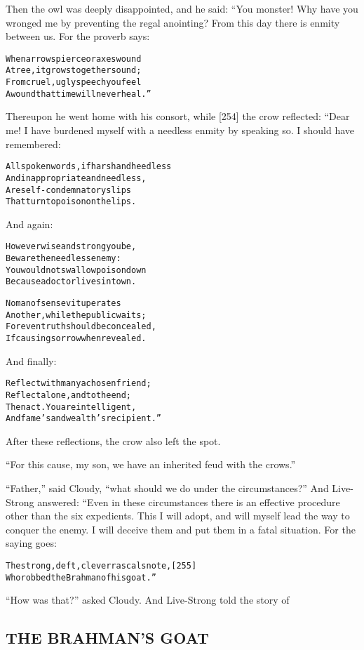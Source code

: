 \documentclass{article}
\renewenvironment{verbatim}{\begin{alltt}\normalfont\begin{centering}}{\end{centering}\end{alltt}}
\begin{document}
Then the owl was deeply disappointed, and he said: “You monster!
Why have you wronged me by preventing the regal anointing? From
this day there is enmity between us. For the proverb says:

\begin{verbatim}
When arrows pierce or axes wound
A tree, it grows together sound;
From cruel, ugly speech you feel
A wound that time will never heal.”
\end{verbatim}
Thereupon he went home with his consort, while [254] the crow
reflected: “Dear me! I have burdened myself with a needless enmity
by speaking so. I should have remembered:

\begin{verbatim}
All spoken words, if harsh and heedless
And inappropriate and needless,
Are self-condemnatory slips
That turn to poison on the lips.
\end{verbatim}
And again:

\begin{verbatim}
However wise and strong you be,
Beware the needless enemy:
You would not swallow poison down
Because a doctor lives in town.

No man of sense vituperates
Another, while the public waits;
For even truth should be concealed,
If causing sorrow when revealed.
\end{verbatim}
And finally:

\begin{verbatim}
Reflect with many a chosen friend;
Reflect alone, and to the end;
Then act. You are intelligent,
And fame's and wealth's recipient.”
\end{verbatim}
After these reflections, the crow also left the spot.

``For this cause, my son, we have an inherited feud with the crows.''

``Father,'' said Cloudy,
``what should we do under the circumstances?'' And Live-Strong
answered: “Even in these circumstances there is an effective
procedure other than the six expedients. This I will adopt, and
will myself lead the way to conquer the enemy. I will deceive them
and put them in a fatal situation. For the saying goes:

\begin{verbatim}
The strong, deft, clever rascals note,                  [255]
Who robbed the Brahman of his goat.”
\end{verbatim}
``How was that?'' asked Cloudy. And Live-Strong told the story of

\subsection{THE BRAHMAN'S GOAT}
\end{document}
